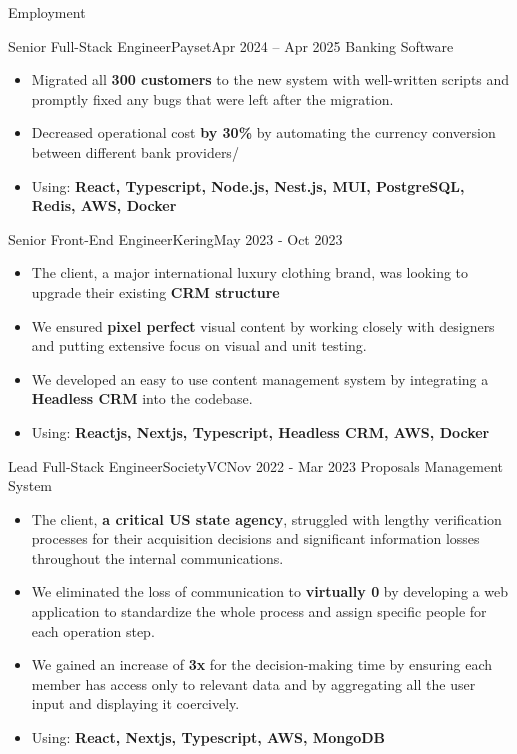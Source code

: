 \documentclass[]{mcdowellcv}
\begin{document}
	\makeheader
	
	\begin{cvsection}{Employment}
		\begin{cvsubsection}{Senior Full-Stack Engineer}{Payset}{Apr 2024 -- Apr 2025}
			Banking Software
			\begin{itemize}
				\item Migrated all \textbf{300 customers} to the new system with well-written scripts and promptly fixed any bugs that were left after the migration.
				\item Decreased operational cost \textbf{by 30\%} by automating the currency conversion between different bank providers/
				\item Using: \textbf{React, Typescript, Node.js, Nest.js, MUI, PostgreSQL, Redis, AWS, Docker}
			\end{itemize}
		\end{cvsubsection}

		\begin{cvsubsection}{Senior Front-End Engineer}{Kering}{May 2023 - Oct 2023}
			\begin{itemize}
				\item The client, a major international luxury clothing brand, was looking to upgrade their existing \textbf{CRM structure}
				\item We ensured \textbf{pixel perfect} visual content by working closely with designers and putting extensive focus on visual and unit testing.
				\item We developed an easy to use content management system by integrating a \textbf{Headless CRM} into the codebase.
				\item Using: \textbf{Reactjs, Nextjs, Typescript, Headless CRM, AWS, Docker}
			\end{itemize}
		\end{cvsubsection}

		\begin{cvsubsection}{Lead Full-Stack Engineer}{SocietyVC}{Nov 2022 - Mar 2023}
			Proposals Management System
			\begin{itemize}
				\item The client, \textbf{a critical US state agency}, struggled with lengthy verification processes for their acquisition decisions and significant information losses throughout the internal communications.
				\item We eliminated the loss of communication to \textbf{virtually 0} by developing a web application to standardize the whole process and assign specific people for each operation step.
				\item We gained an increase of \textbf{3x} for the decision-making time by ensuring each member has access only to relevant data and by aggregating all the user input and displaying it coercively.
				\item Using: \textbf{React, Nextjs, Typescript, AWS, MongoDB}
			\end{itemize}
		\end{cvsubsection}



\end{cvsection}
\end{document}

